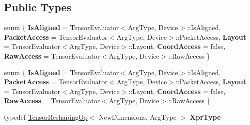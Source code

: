 \subsection*{Public Types}
\begin{DoxyCompactItemize}
\item 
\mbox{\label{struct_eigen_1_1_tensor_evaluator_3_01const_01_tensor_reshaping_op_3_01_new_dimensions_00_01_arg_type_01_4_00_01_device_01_4_ad19445cd800ff82779c1b2c198b4d599}} 
enum \{ \newline
{\bfseries Is\+Aligned} = Tensor\+Evaluator$<$Arg\+Type, Device$>$\+:\+:Is\+Aligned, 
{\bfseries Packet\+Access} = Tensor\+Evaluator$<$Arg\+Type, Device$>$\+:\+:Packet\+Access, 
{\bfseries Layout} = Tensor\+Evaluator$<$Arg\+Type, Device$>$\+:\+:Layout, 
{\bfseries Coord\+Access} = false, 
\newline
{\bfseries Raw\+Access} = Tensor\+Evaluator$<$Arg\+Type, Device$>$\+:\+:Raw\+Access
 \}
\item 
\mbox{\label{struct_eigen_1_1_tensor_evaluator_3_01const_01_tensor_reshaping_op_3_01_new_dimensions_00_01_arg_type_01_4_00_01_device_01_4_ae3ceaa51a8b640e9a2615d8560953a45}} 
enum \{ \newline
{\bfseries Is\+Aligned} = Tensor\+Evaluator$<$Arg\+Type, Device$>$\+:\+:Is\+Aligned, 
{\bfseries Packet\+Access} = Tensor\+Evaluator$<$Arg\+Type, Device$>$\+:\+:Packet\+Access, 
{\bfseries Layout} = Tensor\+Evaluator$<$Arg\+Type, Device$>$\+:\+:Layout, 
{\bfseries Coord\+Access} = false, 
\newline
{\bfseries Raw\+Access} = Tensor\+Evaluator$<$Arg\+Type, Device$>$\+:\+:Raw\+Access
 \}
\item 
\mbox{\label{struct_eigen_1_1_tensor_evaluator_3_01const_01_tensor_reshaping_op_3_01_new_dimensions_00_01_arg_type_01_4_00_01_device_01_4_a02d70f5431c6d01a5827b1481b46b350}} 
typedef \hyperlink{class_eigen_1_1_tensor_reshaping_op}{Tensor\+Reshaping\+Op}$<$ New\+Dimensions, Arg\+Type $>$ {\bfseries Xpr\+Type}
\item 
\mbox{\label{struct_eigen_1_1_tensor_evaluator_3_01const_01_tensor_reshaping_op_3_01_new_dimensions_00_01_arg_type_01_4_00_01_device_01_4_a1d8e9444805a104949048eb4daa119b4}} 

\end{DoxyCompactItemize}
